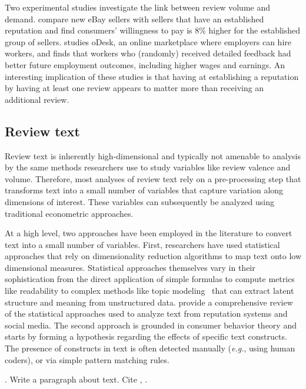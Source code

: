 \documentclass[letter,12pt]{article}
\begin{document}
Two experimental studies investigate the link between review volume and
demand. \citet{resnick2006value} compare new eBay sellers with sellers that
have an established reputation and find consumers' willingness to pay is 8\%
higher for the established group of sellers. \citet{pallais2014inefficient}
studies oDesk, an online marketplace where employers can hire workers, and
finds that workers who (randomly) received detailed feedback had better future
employment outcomes, including higher wages and earnings. An interesting
implication of these studies is that having at establishing a reputation by
having at least one review appears to matter more than receiving an additional
review.

\subsection{Review text}

Review text is inherently high-dimensional and typically not amenable to
analysis by the same methods researchers use to study variables like review
valence and volume. Therefore, most analyses of review text rely on a
pre-processing step that transforms text into a small number of variables that
capture variation along dimensions of interest. These variables can
subsequently be analyzed using traditional econometric approaches.

At a high level, two approaches have been employed in the literature to
convert text into a small number of variables. First, researchers have used
statistical approaches that rely on dimensionality reduction algorithms to map
text onto low dimensional measures. Statistical approaches themselves vary in
their sophistication from the direct application of simple formulas to compute
metrics like readability to complex methods like topic
modeling~\citep{blei2003latent} that can extract latent structure and meaning
from unstructured data. \citet{moe2017social} provide a comprehensive review
of the statistical approaches used to analyze text from reputation systems and
social media. The second approach is grounded in consumer behavior theory and
starts by forming a hypothesis regarding the effects of specific text
constructs. The presence of constructs in text is often detected manually
(\emph{e.g.}, using human coders), or via simple pattern matching rules.

\citet{buschken2016sentence}.
Write a paragraph about text. Cite \citet{ghose2012designing},
\citet{packard2017language}.
\end{document}
